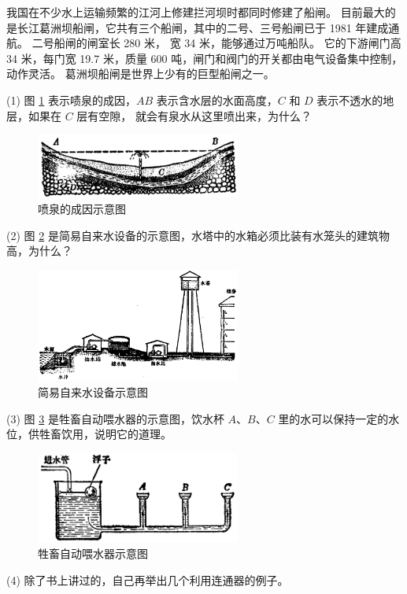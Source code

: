 我国在不少水上运输频繁的江河上修建拦河坝时都同时修建了船闸。
目前最大的是长江葛洲坝船闸，它共有三个船闸，其中的二号、三号船闸已于 1981 年建成通航。
二号船闸的闸室长 280 米， 宽 34 米，能够通过万吨船队。
它的下游闸门高 34 米，每门宽 19.7 米，质量 600 吨，闸门和阀门的开关都由电气设备集中控制，动作灵活。
葛洲坝船闸是世界上少有的巨型船闸之一。



\lianxi

(1) 图 \ref{fig:5-35} 表示啧泉的成因，$AB$ 表示含水层的水面高度，$C$ 和 $D$ 表示不透水的地层，如果在 $C$ 层有空隙，
就会有泉水从这里喷出来，为什么？

\begin{figure}[htbp]
    \centering
    \includegraphics[width=0.6\textwidth]{../pic/czwl1-ch5-35}
    \caption{喷泉的成因示意图}\label{fig:5-35}
\end{figure}

(2) 图 \ref{fig:5-36} 是简易自来水设备的示意图，水塔中的水箱必须比装有水笼头的建筑物高，为什么？

\begin{figure}[htbp]
    \centering
    \includegraphics[width=0.6\textwidth]{../pic/czwl1-ch5-36}
    \caption{简易自来水设备示意图}\label{fig:5-36}
\end{figure}

(3) 图 \ref{fig:5-37} 是牲畜自动喂水器的示意图，饮水杯 $A$、$B$、$C$ 里的水可以保持一定的水位，供牲畜饮用，说明它的道理。

\begin{figure}[htbp]
    \centering
    \includegraphics[width=0.6\textwidth]{../pic/czwl1-ch5-37}
    \caption{牲畜自动喂水器示意图}\label{fig:5-37}
\end{figure}

(4) 除了书上讲过的，自己再举出几个利用连通器的例子。

